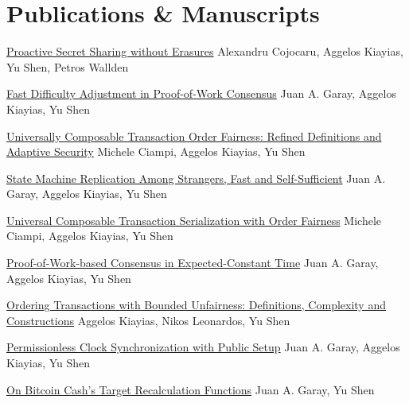 \section{Publications \& Manuscripts}

{\href{https://eprint.iacr.org/2026/1072.pdf}{Proactive Secret Sharing without Erasures}}
{}
{}
{}
{\normalsize Alexandru Cojocaru, Aggelos Kiayias, Yu Shen, Petros Wallden}

{\href{https://eprint.iacr.org/2026/1116.pdf}{Fast Difficulty Adjustment in Proof-of-Work Consensus}}
{}
{}
{}
{\normalsize Juan A. Garay, Aggelos Kiayias, Yu Shen}

{\href{https://eprint.iacr.org/2025/1527.pdf}{Universally Composable Transaction Order Fairness: Refined Definitions and Adaptive Security}}
{}
{}
{}
{\normalsize Michele Ciampi, Aggelos Kiayias, Yu Shen}

{\href{https://eprint.iacr.org/2025/616.pdf}{State Machine Replication Among Strangers, Fast and Self-Sufficient}}
{}
{}
{}
{\normalsize Juan A. Garay, Aggelos Kiayias, Yu Shen}

{\href{https://eprint.iacr.org/2024/1296.pdf}{Universal Composable Transaction Serialization with Order Fairness}}
{}
{}
{}
{\normalsize Michele Ciampi, Aggelos Kiayias, Yu Shen}

{\href{https://eprint.iacr.org/2023/1663.pdf}{Proof-of-Work-based Consensus in Expected-Constant Time}}
{}
{}
{}
{\normalsize Juan A. Garay, Aggelos Kiayias, Yu Shen}

{\href{https://eprint.iacr.org/2023/1253.pdf}{Ordering Transactions with Bounded Unfairness: Definitions, Complexity and Constructions}}
{}
{}
{}
{\normalsize Aggelos Kiayias, Nikos Leonardos, Yu Shen}

{\href{https://eprint.iacr.org/2022/1220.pdf}{Permissionless Clock Synchronization with Public Setup}}
{}
{}
{}
{\normalsize Juan A. Garay, Aggelos Kiayias, Yu Shen}

{\href{https://eprint.iacr.org/2021/143.pdf}{On Bitcoin Cash's Target Recalculation Functions}}
{}
{}
{}
{\normalsize Juan A. Garay, Yu Shen}
